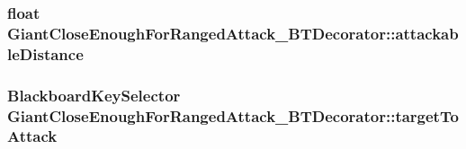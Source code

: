 \subsubsection[{\texorpdfstring{attackable\+Distance}{attackableDistance}}]{\setlength{\rightskip}{0pt plus 5cm}float Giant\+Close\+Enough\+For\+Ranged\+Attack\+\_\+\+B\+T\+Decorator\+::attackable\+Distance}\hypertarget{class_giant_close_enough_for_ranged_attack___b_t_decorator_a994ad90e6d00df363f635eee1fcf2146}{}\label{class_giant_close_enough_for_ranged_attack___b_t_decorator_a994ad90e6d00df363f635eee1fcf2146}
\subsubsection[{\texorpdfstring{target\+To\+Attack}{targetToAttack}}]{\setlength{\rightskip}{0pt plus 5cm}Blackboard\+Key\+Selector Giant\+Close\+Enough\+For\+Ranged\+Attack\+\_\+\+B\+T\+Decorator\+::target\+To\+Attack}\hypertarget{class_giant_close_enough_for_ranged_attack___b_t_decorator_a1cc248f03397ce0e086ac9b16bd732e1}{}\label{class_giant_close_enough_for_ranged_attack___b_t_decorator_a1cc248f03397ce0e086ac9b16bd732e1}
